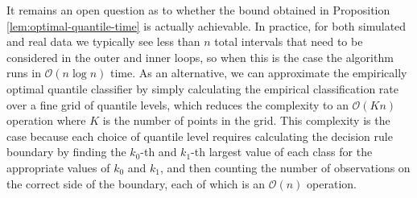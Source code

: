 It remains an open question as to whether the bound obtained in Proposition
\ref{lem:optimal-quantile-time} is actually achievable.  In practice, for both
simulated and real data we typically see less than $n$ total intervals that need
to be considered in the outer and inner loops, so when this is the case the
algorithm runs in $\mathcal{O}(n \log n)$ time.  As an alternative, we can
approximate the empirically optimal quantile classifier by simply calculating
the empirical classification rate over a fine grid of quantile levels, which
reduces the complexity to an $\mathcal{O}(Kn)$ operation where $K$ is the number
of points in the grid.  This complexity is the case because each choice of
quantile level requires calculating the decision rule boundary by finding the
$k_0$-th and $k_1$-th largest value of each class for the appropriate values of
$k_0$ and $k_1$, and then counting the number of observations on the correct
side of the boundary, each of which is an $\mathcal{O}(n)$ operation.




